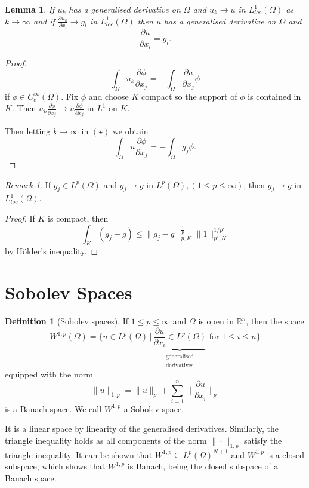 \documentclass[10pt, oneside, reqno]{amsart}
\theoremstyle{plain}%
\newtheorem{lem}[thm]{Lemma}
\numberwithin{equation}{section}
\theoremstyle{definition}
\newtheorem{defn}[thm]{Definition}
\theoremstyle{remark}
\newtheorem*{rem}{Remark}
\newcommand{\given}{ \, | \,}
\newcommand{\R}{\mathbb{R}}
\begin{document}
\begin{lem}
	\label{lem:convergence_of_gen_deriv}
	If $u_k$ has a generalised derivative on $\Omega$ and $u_k \rightarrow u$ in $L^1_{loc}(\Omega)$ as $k \rightarrow \infty$ and if $\frac{\partial u_k}{\partial x_l} \rightarrow g_l$ in $L^1_{loc}(\Omega)$ then $u$ has a generalised derivative on $\Omega$ and \[
		\frac{\partial u}{\partial x_l} = g_l.
	\]
\end{lem}

\begin{proof}
	\[
		\int_\Omega u_k \frac{\partial \phi}{\partial x_j} = -\int_\Omega \frac{\partial u}{\partial x_j} \phi
		\tag{$\star$}
	\] if $\phi \in C_c^\infty(\Omega)$.  Fix $\phi$ and choose $K$ compact so the support of $\phi$ is contained in $K$.  Then $u_k {\frac{\partial \phi}{\partial x_j}} \rightarrow u \frac{\partial \phi}{\partial x_j}$ in $L^1$ on $K$.  
	
	Then letting $k \rightarrow \infty$ in $(\star)$ we obtain \[
		\int_\Omega u \frac{\partial \phi}{\partial x_j} = - \int_\Omega g_j \phi.
	\]
\end{proof}

\begin{rem}
	If $g_j \in L^p(\Omega)$ and $g_j \rightarrow g$ in $L^p(\Omega), (1 \leq p \leq \infty)$, then $g_j \rightarrow g$ in $L^1_{loc}(\Omega)$.  
\end{rem}

\begin{proof}
	If $K$ is compact, then \[
		\int_K (g_j - g) \leq \| g_j - g\|_{p, K}^\frac{1}{p} \| 1 \|^{1/p'}_{p', K}
	\] by H\"older's inequality.
\end{proof}

\section{Sobolev Spaces} %
\label{sec:sobolev_spaces}

\begin{defn}[Sobolev spaces]
	If $1 \leq p \leq \infty$ and $\Omega$ is open in $\R^n$, then the space \[
		W^{1, p}(\Omega) = \{ u \in L^p(\Omega) \given \underbrace{\frac{\partial u}{\partial x_i} \in L^p(\Omega)}_{\substack{\text{generalised} \\ \text{derivatives}}} \text{ for } 1 \leq i \leq n \}
	\] 
	equipped with the norm \[
		\| u \|_{1, p} = \| u \|_p + \sum_{i=1}^n \| \frac{\partial u}{\partial x_i} \|_p
	\] is a Banach space.  We call $W^{1, p}$ a Sobolev space.

	It is a linear space by linearity of the generalised derivatives.  Similarly, the triangle inequality holds as all components of the norm $\| \cdot \|_{1, p}$ satisfy the triangle inequality.  It can be shown that $W^{1, p} \subseteq L^p(\Omega)^{N+1}$ and $W^{1, p}$ is a closed subspace, which shows that $W^{1, p}$ is Banach, being the closed subspace of a Banach space.
\end{defn}
\end{document}
